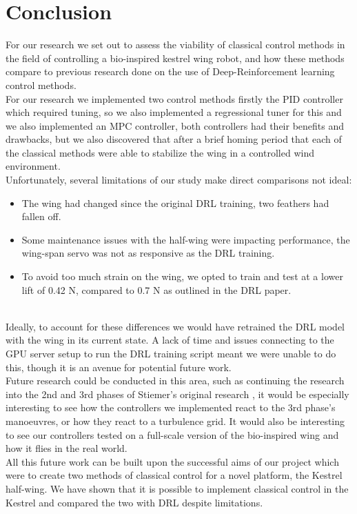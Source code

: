 \section{Conclusion}
For our research we set out to assess the viability of classical control methods in the field of controlling a bio-inspired kestrel wing robot, and how these methods compare to previous research done on the use of Deep-Reinforcement learning control methods.
\\
For our research we implemented two control methods firstly the PID controller which required tuning, so we also implemented a regressional tuner for this and we also implemented an MPC controller, both controllers had their benefits and drawbacks, but we also discovered that after a brief homing period that each of the classical methods were able to stabilize the wing in a controlled wind environment.
\\
Unfortunately, several limitations of our study make direct comparisons not ideal:
\begin{itemize}
    \item The wing had changed since the original DRL training, two feathers had fallen off.
    \item Some maintenance issues with the half-wing were impacting performance, the wing-span servo was not as responsive as the DRL training.
    \item To avoid too much strain on the wing, we opted to train and test at a lower lift of 0.42 N, compared to 0.7 N as outlined in the DRL paper.
\end{itemize}
\\
Ideally, to account for these differences we would have retrained the DRL model with the wing in its current state. A lack of time and issues connecting to the GPU server setup to run the DRL training script meant we were unable to do this, though it is an avenue for potential future work. 
\\
Future research could be conducted in this area, such as continuing the research into the 2nd and 3rd phases of Stiemer's original research \cite{5}, it would be especially interesting to see how the controllers we implemented react to the 3rd phase's manoeuvres, or how they react to a turbulence grid. It would also be interesting to see our controllers tested on a full-scale version of the bio-inspired wing and how it flies in the real world.
\\
All this future work can be built upon the successful aims of our project which were to create two methods of classical control for a novel platform, the Kestrel half-wing. We have shown that it is possible to implement classical control in the Kestrel and compared the two with DRL despite limitations.
